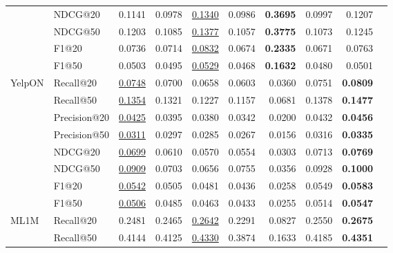 \begin{table}[]
{\begin{tabular}{@{}l|l|rrrrrr|rl@{}}
                        & NDCG@20      & 0.1141       & 0.0978       & {\ul {0.1340}}    & 0.0986 & \textbf{0.3695} & 0.0997 & 0.1207          &  \\
                        & NDCG@50      & 0.1203       & 0.1085       & {\ul {0.1377}}    & 0.1057 & \textbf{0.3775} & 0.1073 & 0.1245          &  \\
                        & F1@20        & 0.0736       & 0.0714       & {\ul {0.0832}}    & 0.0674 & \textbf{0.2335} & 0.0671 & 0.0763          &  \\
                        & F1@50        & 0.0503       & 0.0495       & {\ul {0.0529}}    & 0.0468 & \textbf{0.1632} & 0.0480 & 0.0501          &  \\ \midrule
\multirow{8}{*}{YelpON} & Recall@20    & {\ul {0.0748}} & 0.0700       & 0.0658          & 0.0603 & 0.0360          & 0.0751 & \textbf{0.0809} &  \\
                        & Recall@50    & {\ul {0.1354}} & 0.1321       & 0.1227          & 0.1157 & 0.0681          & 0.1378 & \textbf{0.1477} &  \\
                        & Precision@20 & {\ul {0.0425}} & 0.0395       & 0.0380          & 0.0342 & 0.0200          & 0.0432 & \textbf{0.0456} &  \\
                        & Precision@50 & {\ul {0.0311}} & 0.0297       & 0.0285          & 0.0267 & 0.0156          & 0.0316 & \textbf{0.0335} &  \\
                        & NDCG@20      & {\ul {0.0699}} & 0.0610       & 0.0570          & 0.0554 & 0.0303          & 0.0713 & \textbf{0.0769} &  \\
                        & NDCG@50      & {\ul {0.0909}} & 0.0703       & 0.0656          & 0.0755 & 0.0356          & 0.0928 & \textbf{0.1000} &  \\
                        & F1@20        & {\ul {0.0542}} & 0.0505       & 0.0481          & 0.0436 & 0.0258          & 0.0549 & \textbf{0.0583} &  \\
                        & F1@50        & {\ul {0.0506}} & 0.0485       & 0.0463          & 0.0433 & 0.0255          & 0.0514 & \textbf{0.0547} &  \\ \midrule
\multirow{8}{*}{ML1M}   & Recall@20    & 0.2481       & 0.2465       & {\ul {0.2642}}    & 0.2291 & 0.0827          & 0.2550 & \textbf{0.2675} &  \\
                        & Recall@50    & 0.4144       & 0.4125       & {\ul {0.4330}}    & 0.3874 & 0.1633          & 0.4185 & \textbf{0.4351} &  \\

\end{tabular}}
\end{table}
